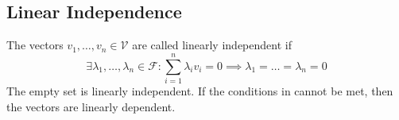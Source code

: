\subsection{Linear Independence}

\begin{definition}\label{def-linear-independence}
	The vectors $v_1,\dots,v_n\in\mathcal{V}$ are called linearly independent if
	\begin{equation}
		\exists\lambda_1, \dots,\lambda_n\in\mathcal{F}:\sum_{i=1}^n \lambda_i v_i = 0
		\implies \lambda_1 = \dots = \lambda_n = 0\label{eq-linearly-independence}
	\end{equation}
	The empty set is linearly independent. If the conditions in 
	cannot be met, then the vectors are linearly dependent.
\end{definition}

